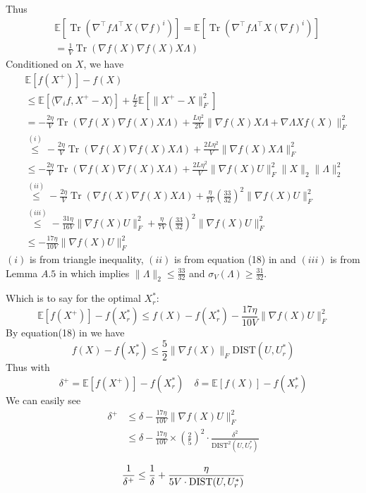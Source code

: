 \documentclass[letterpaper]{article} %
\DeclareMathOperator{\Tr}{Tr} %
\begin{document}
Thus 
\begin{equation}
\begin{split}
&\mathbb{E}[\Tr(\nabla^\top f\Lambda^\top X(\nabla f)^i)]=\mathbb{E}[\Tr(\nabla^\top f\Lambda^\top X(\nabla f)^i)]\\
&=\frac{1}{V} \Tr(\nabla f(X)\nabla f(X)X\Lambda)
\end{split}
\end{equation}
Conditioned on $X$, we have
\begin{equation}
\begin{split}
&\mathbb{E}[f(X^+)]-f(X)\\&\le \mathbb{E}[\langle\nabla_i f, X^+-X \rangle]+\frac{L}{2}\mathbb{E}[\|X^+-X\|_F^2] \\
&=-\frac{2\eta}{V}\Tr(\nabla f(X)\nabla f(X)X\Lambda)+\frac{L\eta^2}{2V}\|\nabla f(X)X\Lambda+\nabla \Lambda Xf(X)\|^2_F\\
&\overset{(i)}{\le}-\frac{2\eta}{V}\Tr(\nabla f(X)\nabla f(X)X\Lambda)+\frac{2L\eta^2}{V}\|\nabla f(X)X\Lambda\|^2_F\\
&\le-\frac{2\eta}{V}\Tr(\nabla f(X)\nabla f(X)X\Lambda)+\frac{2L\eta^2}{V}\|\nabla f(X)U\|^2_F\|X\|_2\|\Lambda\|^2_2\\
&\overset{(ii)}{\le}-\frac{2\eta}{V}\Tr(\nabla f(X)\nabla f(X)X\Lambda)+\frac{\eta}{7V}(\frac{33}{32})^2\|\nabla f(X)U\|^2_F\\
&\overset{(iii)}{\le}-\frac{31\eta}{16V}\|\nabla f(X)U\|^2_F+\frac{\eta}{7V}(\frac{33}{32})^2\|\nabla f(X)U\|^2_F\\
&\le-\frac{17\eta}{10V}\|\nabla f(X)U\|^2_F
\end{split}
\end{equation}
$(i)$ is from triangle inequality, $(ii)$ is from equation (18) in \cite{park2016finding} and $(iii)$ is from Lemma $A.5$ in \cite{park2016finding} which implies $\|\Lambda\|_2\le \frac{33}{32}$ and $\sigma_V(\Lambda)\ge \frac{31}{32}$.

Which is to say for the optimal $X_r^*$:
\begin{equation}
 \mathbb{E}[f(X^+)]-f(X_r^*)\le f(X)-f(X_r^*)-\frac{17\eta}{10V}\|\nabla f(X)U\|^2_F
\label{eq: sublinear}
\end{equation}
By equation(18) in \cite{tu2015low} we have 
\begin{equation}
f(X)-f(X_r^*)\le\frac{5}{2}\|\nabla f(X)\|_F\text{DIST}(U,U^*_r) \label{eq:distance}
\end{equation}
Thus with 
$$\delta^+= \mathbb{E}[f(X^+)]-f(X_r^*)\quad \delta=\mathbb{E}[f(X)]-f(X_r^*)$$
We can easily see
\begin{equation}
\begin{split}
\delta^+&\le\delta -\frac{17\eta}{10V}\|\nabla f(X)U\|^2_F\\
&\le\delta -\frac{17\eta}{10V}\times(\frac{2}{5})^2\cdot\frac{\delta^2}{\text{DIST}^2(U,U^*_r)}\\
\end{split}
\end{equation}
\begin{equation}
\frac{1}{\delta^+}\le\frac{1}{\delta}+ \frac{\eta}{5V\cdot\text{DIST}(U,U^*_r)}\\
\end{equation}
\end{document}
